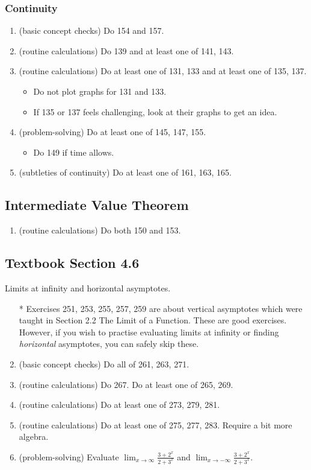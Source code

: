 \documentclass[./main.tex]{subfiles}
\begin{document}
\subsubsection*{Continuity}
\begin{enumerate}
  \item (basic concept checks) Do 154 and 157.
  \item (routine calculations) Do 139 and at least one of 141, 143.
  \item (routine calculations) Do at least one of 131, 133 and at least one of 135, 137.
    \begin{itemize}
      \item Do not plot graphs for 131 and 133. 
      \item If 135 or 137 feels challenging, look at their graphs to get an idea. 
    \end{itemize}
  \item (problem-solving) Do at least one of 145, 147, 155.
    \begin{itemize}
      \item Do 149 if time allows.
    \end{itemize}
  \item (subtleties of continuity) Do at least one of 161, 163, 165.
\end{enumerate}

\subsection*{Intermediate Value Theorem}
\begin{enumerate}
  \item (routine calculations) Do both 150 and 153.
\end{enumerate}

\clearpage
\subsection*{Textbook Section 4.6}

Limits at infinity and horizontal asymptotes.
\begin{enumerate}
  \item[*] Exercises 251, 253, 255, 257, 259 are about vertical asymptotes which were taught in Section 2.2 The Limit of a Function. These are good exercises. However, if you wish to practise evaluating limits at infinity or finding \emph{horizontal} asymptotes, you can safely skip these.
  \item (basic concept checks) Do all of 261, 263, 271.
  \item (routine calculations) Do 267. Do at least one of 265, 269. 
  \item (routine calculations) Do at least one of 273, 279, 281.
  \item (routine calculations) Do at least one of 275, 277, 283. Require a bit more algebra.
  \item (problem-solving) Evaluate \(\lim_{x \to \infty} \frac{3 + 2^{x}}{2 + 3^{x}}\) and \(\lim_{x \to -\infty} \frac{3 + 2^{x}}{2 + 3^{x}}\).
\end{enumerate}
\end{document}
